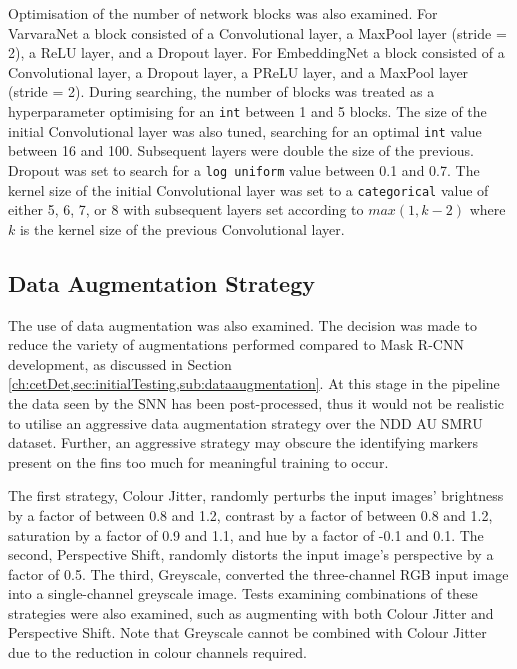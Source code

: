 Optimisation of the number of network blocks was also examined. For VarvaraNet a block consisted of a Convolutional layer, a MaxPool layer (stride = 2), a ReLU layer, and a Dropout layer. For EmbeddingNet a block consisted of a Convolutional layer, a Dropout layer, a PReLU layer, and a MaxPool layer (stride = 2). During searching, the number of blocks was treated as a hyperparameter optimising for an \texttt{int} between 1 and 5 blocks. The size of the initial Convolutional layer was also tuned, searching for an optimal \texttt{int} value between 16 and 100. Subsequent layers were double the size of the previous. Dropout was set to search for a \texttt{log uniform} value between 0.1 and 0.7. The kernel size of the initial Convolutional layer was set to a \texttt{categorical} value of either 5, 6, 7, or 8 with subsequent layers set according to $max(1, k - 2)$ where $k$ is the kernel size of the previous Convolutional layer.

\subsection{Data Augmentation Strategy}\label{ch:ID,sec:SNNDevelopment,sub:DataAugmentation}

The use of data augmentation was also examined. The decision was made to reduce the variety of augmentations performed compared to Mask R-CNN development, as discussed in Section \ref{ch:cetDet,sec:initialTesting,sub:dataaugmentation}. At this stage in the pipeline the data seen by the SNN has been post-processed, thus it would not be realistic to utilise an aggressive data augmentation strategy over the NDD AU SMRU dataset. Further, an aggressive strategy may obscure the identifying markers present on the fins too much for meaningful training to occur. 

The first strategy, Colour Jitter, randomly perturbs the input images' brightness by a factor of between 0.8 and 1.2, contrast by a factor of between 0.8 and 1.2, saturation by a factor of 0.9 and 1.1, and hue by a factor of -0.1 and 0.1. The second, Perspective Shift, randomly distorts the input image's perspective by a factor of 0.5. The third, Greyscale, converted the three-channel RGB input image into a single-channel greyscale image. Tests examining combinations of these strategies were also examined, such as augmenting with both Colour Jitter and Perspective Shift. Note that Greyscale cannot be combined with Colour Jitter due to the reduction in colour channels required. 


